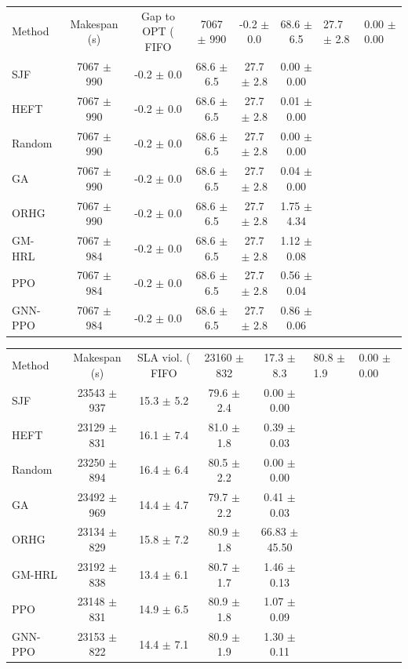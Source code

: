\begin{tabular}{lccccc}
\toprule
Method & Makespan (s) & Gap to OPT (%
\midrule
FIFO & 7067 $\pm$ 990 & -0.2 $\pm$ 0.0 & 68.6 $\pm$ 6.5 & 27.7 $\pm$ 2.8 & 0.00 $\pm$ 0.00 \\
SJF & 7067 $\pm$ 990 & -0.2 $\pm$ 0.0 & 68.6 $\pm$ 6.5 & 27.7 $\pm$ 2.8 & 0.00 $\pm$ 0.00 \\
HEFT & 7067 $\pm$ 990 & -0.2 $\pm$ 0.0 & 68.6 $\pm$ 6.5 & 27.7 $\pm$ 2.8 & 0.01 $\pm$ 0.00 \\
Random & 7067 $\pm$ 990 & -0.2 $\pm$ 0.0 & 68.6 $\pm$ 6.5 & 27.7 $\pm$ 2.8 & 0.00 $\pm$ 0.00 \\
GA & 7067 $\pm$ 990 & -0.2 $\pm$ 0.0 & 68.6 $\pm$ 6.5 & 27.7 $\pm$ 2.8 & 0.04 $\pm$ 0.00 \\
ORHG & 7067 $\pm$ 990 & -0.2 $\pm$ 0.0 & 68.6 $\pm$ 6.5 & 27.7 $\pm$ 2.8 & 1.75 $\pm$ 4.34 \\
GM-HRL & 7067 $\pm$ 984 & -0.2 $\pm$ 0.0 & 68.6 $\pm$ 6.5 & 27.7 $\pm$ 2.8 & 1.12 $\pm$ 0.08 \\
PPO & 7067 $\pm$ 984 & -0.2 $\pm$ 0.0 & 68.6 $\pm$ 6.5 & 27.7 $\pm$ 2.8 & 0.56 $\pm$ 0.04 \\
GNN-PPO & 7067 $\pm$ 984 & -0.2 $\pm$ 0.0 & 68.6 $\pm$ 6.5 & 27.7 $\pm$ 2.8 & 0.86 $\pm$ 0.06 \\
\bottomrule
\end{tabular}

\begin{tabular}{lcccc}
\toprule
Method & Makespan (s) & SLA viol. (%
\midrule
FIFO & 23160 $\pm$ 832 & 17.3 $\pm$ 8.3 & 80.8 $\pm$ 1.9 & 0.00 $\pm$ 0.00 \\
SJF & 23543 $\pm$ 937 & 15.3 $\pm$ 5.2 & 79.6 $\pm$ 2.4 & 0.00 $\pm$ 0.00 \\
HEFT & 23129 $\pm$ 831 & 16.1 $\pm$ 7.4 & 81.0 $\pm$ 1.8 & 0.39 $\pm$ 0.03 \\
Random & 23250 $\pm$ 894 & 16.4 $\pm$ 6.4 & 80.5 $\pm$ 2.2 & 0.00 $\pm$ 0.00 \\
GA & 23492 $\pm$ 969 & 14.4 $\pm$ 4.7 & 79.7 $\pm$ 2.2 & 0.41 $\pm$ 0.03 \\
ORHG & 23134 $\pm$ 829 & 15.8 $\pm$ 7.2 & 80.9 $\pm$ 1.8 & 66.83 $\pm$ 45.50 \\
GM-HRL & 23192 $\pm$ 838 & 13.4 $\pm$ 6.1 & 80.7 $\pm$ 1.7 & 1.46 $\pm$ 0.13 \\
PPO & 23148 $\pm$ 831 & 14.9 $\pm$ 6.5 & 80.9 $\pm$ 1.8 & 1.07 $\pm$ 0.09 \\
GNN-PPO & 23153 $\pm$ 822 & 14.4 $\pm$ 7.1 & 80.9 $\pm$ 1.9 & 1.30 $\pm$ 0.11 \\
\bottomrule
\end{tabular}

